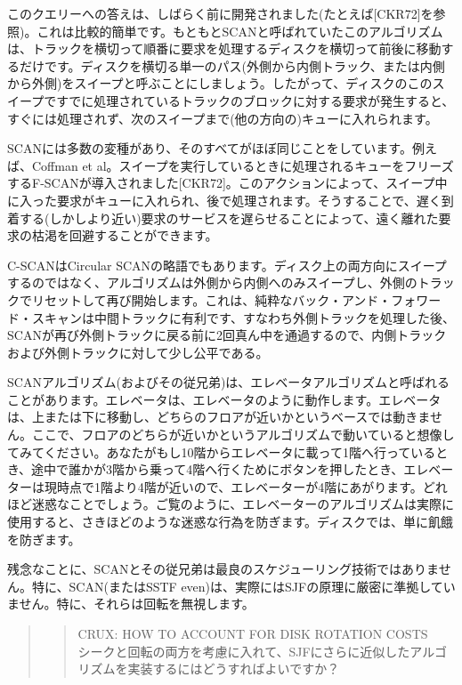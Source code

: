 このクエリーへの答えは、しばらく前に開発されました(たとえば{[}CKR72{]}を参照)。これは比較的簡単です。もともとSCANと呼ばれていたこのアルゴリズムは、トラックを横切って順番に要求を処理するディスクを横切って前後に移動するだけです。ディスクを横切る単一のパス(外側から内側トラック、または内側から外側)をスイープと呼ぶことにしましょう。したがって、ディスクのこのスイープですでに処理されているトラックのブロックに対する要求が発生すると、すぐには処理されず、次のスイープまで(他の方向の)キューに入れられます。

SCANには多数の変種があり、そのすべてがほぼ同じことをしています。例えば、Coffman
et
al。スイープを実行しているときに処理されるキューをフリーズするF-SCANが導入されました{[}CKR72{]}。このアクションによって、スイープ中に入った要求がキューに入れられ、後で処理されます。そうすることで、遅く到着する(しかしより近い)要求のサービスを遅らせることによって、遠く離れた要求の枯渇を回避することができます。

C-SCANはCircular
SCANの略語でもあります。ディスク上の両方向にスイープするのではなく、アルゴリズムは外側から内側へのみスイープし、外側のトラックでリセットして再び開始します。これは、純粋なバック・アンド・フォワード・スキャンは中間トラックに有利です、すなわち外側トラックを処理した後、SCANが再び外側トラックに戻る前に2回真ん中を通過するので、内側トラックおよび外側トラックに対して少し公平である。

SCANアルゴリズム(およびその従兄弟)は、エレベータアルゴリズムと呼ばれることがあります。エレベータは、エレベータのように動作します。エレベータは、上または下に移動し、どちらのフロアが近いかというベースでは動きません。ここで、フロアのどちらが近いかというアルゴリズムで動いていると想像してみてください。あなたがもし10階からエレベータに載って1階へ行っているとき、途中で誰かが3階から乗って4階へ行くためにボタンを押したとき、エレベーターは現時点で1階より4階が近いので、エレベーターが4階にあがります。どれほど迷惑なことでしょう。ご覧のように、エレベーターのアルゴリズムは実際に使用すると、さきほどのような迷惑な行為を防ぎます。ディスクでは、単に飢餓を防ぎます。

残念なことに、SCANとその従兄弟は最良のスケジューリング技術ではありません。特に、SCAN(またはSSTF
even)は、実際にはSJFの原理に厳密に準拠していません。特に、それらは回転を無視します。

\begin{quote}
\begin{quote}
CRUX: HOW TO ACCOUNT FOR DISK ROTATION COSTS\\
シークと回転の両方を考慮に入れて、SJFにさらに近似したアルゴリズムを実装するにはどうすればよいですか？
\end{quote}
\end{quote}

